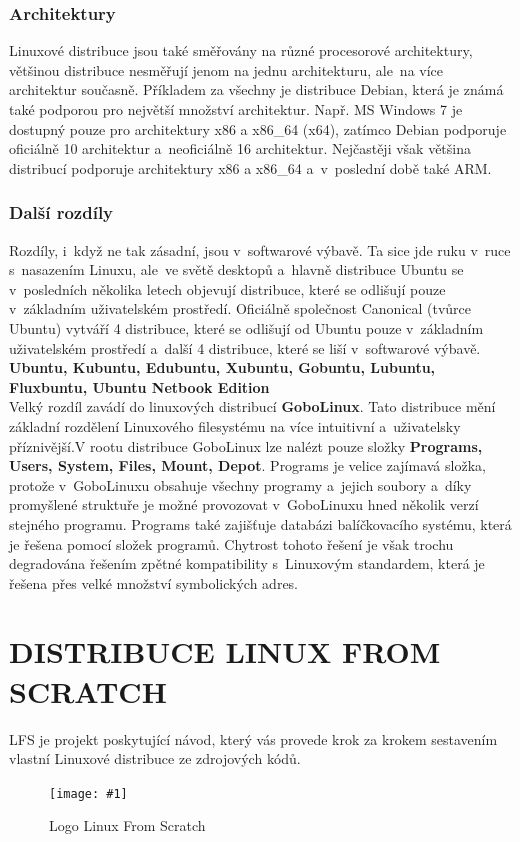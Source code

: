 \documentclass[a4paper,12pt]{article}
\newcommand{\upc}[1]{\uppercase{#1}} %
\newcommand{\obr}[3]{%
	\begin{figure}[h]
	\center\texttt{[image: \#1]}
	\caption{#3}
	\end{figure}
	}
\renewcommand{\b}[1]{\textbf{#1}} %
\begin{document}
\subsubsection{Architektury}
Linuxové distribuce jsou také směřovány na různé procesorové architektury, většinou distribuce nesměřují jenom na jednu architekturu, ale~na více architektur současně. Příkladem za všechny je distribuce Debian, která je známá také podporou pro největší množství architektur. Např. MS Windows 7 je dostupný pouze pro architektury x86 a x86\_64 (x64), zatímco Debian podporuje oficiálně 10 architektur a~neoficiálně 16 architektur. Nejčastěji však většina distribucí podporuje architektury x86 a x86\_64 a~v~poslední době také ARM.

\subsubsection{Další rozdíly}
Rozdíly, i~když ne tak zásadní, jsou v~softwarové výbavě. Ta sice jde ruku v~ruce s~nasazením Linuxu, ale~ve světě desktopů a~hlavně distribuce Ubuntu se v~posledních několika letech objevují distribuce, které se odlišují pouze v~základním uživatelském prostředí. Oficiálně společnost Canonical (tvůrce Ubuntu) vytváří 4 distribuce, které se odlišují od Ubuntu pouze v~základním uživatelském prostředí a~další 4 distribuce, které se liší v~softwarové výbavě.
\b{Ubuntu, Kubuntu, Edubuntu, Xubuntu, Gobuntu, Lubuntu, Fluxbuntu, Ubuntu Netbook Edition}\\

Velký rozdíl zavádí do linuxových distribucí \textbf{GoboLinux}. Tato distribuce mění základní rozdělení Linuxového filesystému na více intuitivní a~uživatelsky příznivější.V rootu distribuce GoboLinux lze nalézt pouze složky \b{Programs, Users, System, Files, Mount, Depot}. Programs je velice zajímavá složka, protože v~GoboLinuxu obsahuje všechny programy a~jejich soubory a~díky promyšlené struktuře je možné provozovat v~GoboLinuxu hned několik verzí stejného programu. Programs také zajišťuje databázi balíčkovacího systému, která je řešena pomocí složek programů. Chytrost tohoto řešení je však trochu degradována řešením zpětné kompatibility s~Linuxovým standardem, která je řešena přes velké množství symbolických adres.~\cite{GoboLinuxFilesystem}~\cite{GoboLinuxMain}

\section{\upc{Distribuce Linux from scratch}}
LFS je projekt poskytující návod, který vás provede krok za krokem sestavením vlastní Linuxové distribuce ze zdrojových kódů.~\cite{LFSwMAIN}
\obr{./img/lfs-logo.png}{1}{Logo Linux From Scratch}
\end{document}

